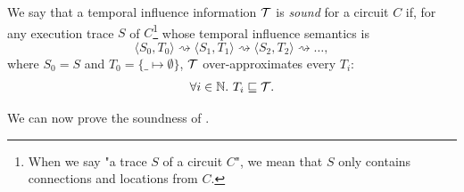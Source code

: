 \begin{definition}\label{def:soundness}
    We say that a temporal influence information $\mathcal{T}$ is \emph{sound} for a circuit $C$ if, for any execution trace $S$ of $C$\footnote{When we say "a trace $S$ of a circuit $C$", we mean that $S$ only contains connections and locations from $C$.} whose temporal influence semantics is
    \[
    \langle S_0, T_0\rangle \rightsquigarrow \langle S_1, T_1\rangle \rightsquigarrow \langle S_2, T_2\rangle \rightsquigarrow \dots,
    \]
    where $S_0 = S$ and $T_0 = \{\_ \mapsto \emptyset\}$, $\mathcal{T}$ over-approximates every $T_i$:
    \[
    \forall i \in \mathbb{N}.\ T_i \sqsubseteq \mathcal{T}.
    \]
\end{definition}

We can now prove the soundness of \tia.

